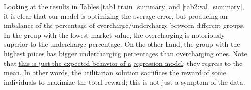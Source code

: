 \documentclass{article}
\begin{document}

Looking at the results in Tables \ref{tab1:train_summary} and \ref{tab2:val_summary}, it is clear that our model is optimizing the average error, but producing an imbalance of the percentage of overcharge/undercharge between different groups. In the group with the lowest market value, the overcharging is notoriously superior to the undercharge percentage. On the other hand, the group with the highest prices has bigger undercharging percentages than overcharging ones. Note that \underline{this is just the expected behavior of a} \underline{regression model}; they regress to the mean. In other words, the utilitarian solution sacrifices the reward of some individuals to maximize the total reward; this is not just a symptom of the data.
\end{document}
